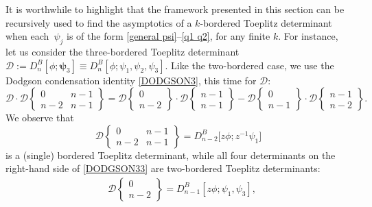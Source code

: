 \documentclass[10pt,a4paper]{amsart}
\numberwithin{equation}{section}
\begin{document}
\begin{Remark}\label{remark multi-bordered} \normalfont
It is worthwhile to highlight that the framework presented in this section can be recursively used to find the asymptotics of a $k$-bordered Toeplitz determinant when each~$\psi_j$ is of the form \eqref{general psi}--\eqref{q1 q2}, for any finite $k$. For instance, let us consider the three-bordered Toeplitz determinant
$
\mathcal{D}:= D^B_n[\phi;\boldsymbol{\psi}_3] \equiv D^B_n[\phi;\psi_1,\psi_2,\psi_3]$.
			Like the two-bordered case, we use the Dodgson condensation identity \eqref{DODGSON3}, this time for $\mathcal{D}$:
			\begin{equation}\label{DODGSON33}
				\mathcal{D} \cdot \mathcal{D}\left\lbrace \begin{matrix} 0 & n-1 \\ n-2& n-1 \end{matrix} \right\rbrace = \mathcal{D}\left\lbrace \begin{matrix} 0 \\ n-2 \end{matrix} \right\rbrace \cdot \mathcal{D}\left\lbrace \begin{matrix} n-1 \\ n-1 \end{matrix} \right\rbrace - \mathcal{D}\left\lbrace \begin{matrix} 0 \\ n-1 \end{matrix} \right\rbrace \cdot \mathcal{D}\left\lbrace \begin{matrix} n-1 \\ n-2 \end{matrix} \right\rbrace.
			\end{equation}
			We observe that
			\begin{equation*}
				\mathcal{D}\left\lbrace \begin{matrix} 0 & n-1 \\ n-2& n-1 \end{matrix} \right\rbrace = D^B_{n-2}\big[z\phi;z^{-1}\psi_1\big]
			\end{equation*}
			is a (single) bordered Toeplitz determinant, while all four determinants on the right-hand side of \eqref{DODGSON33} are two-bordered Toeplitz determinants:
			\begin{align}
				&\mathcal{D}\left\lbrace \begin{matrix} 0 \\ n-2 \end{matrix} \right\rbrace = D^B_{n-1}[z\phi;\psi_1,\psi_3], \label{E11} \\

\end{align}
\end{Remark}
\end{document}
